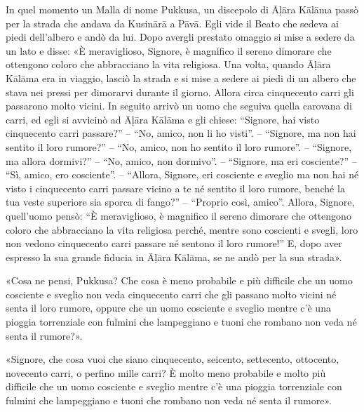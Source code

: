 

In quel momento un Malla di nome Pukkusa, un discepolo di Āḷāra Kālāma
passò per la strada che andava da Kusinārā a Pāvā. Egli vide il Beato
che sedeva ai piedi dell’albero e andò da lui. Dopo avergli prestato
omaggio si mise a sedere da un lato e disse: «È meraviglioso, Signore, è
magnifico il sereno dimorare che ottengono coloro che abbracciano la
vita religiosa. Una volta, quando Āḷāra Kālāma era in viaggio, lasciò la
strada e si mise a sedere ai piedi di un albero che stava nei pressi per
dimorarvi durante il giorno. Allora circa cinquecento carri gli
passarono molto vicini. In seguito arrivò un uomo che seguiva quella
carovana di carri, ed egli si avvicinò ad Āḷāra Kālāma e gli chiese:
“Signore, hai visto cinquecento carri passare?” – “No, amico, non li ho
visti”. – “Signore, ma non hai sentito il loro rumore?” – “No, amico,
non ho sentito il loro rumore”. – “Signore, ma allora dormivi?” – “No,
amico, non dormivo”. – “Signore, ma eri cosciente?” – “Sì, amico, ero
cosciente”. – “Allora, Signore, eri cosciente e sveglio ma non hai né
visto i cinquecento carri passare vicino a te né sentito il loro rumore,
benché la tua veste superiore sia sporca di fango?” – “Proprio così,
amico”. Allora, Signore, quell’uomo pensò: “È meraviglioso, è magnifico
il sereno dimorare che ottengono coloro che abbracciano la vita
religiosa perché, mentre sono coscienti e svegli, loro non vedono
cinquecento carri passare né sentono il loro rumore!” E, dopo aver
espresso la sua grande fiducia in Āḷāra Kālāma, se ne andò per la sua
strada».


«Cosa ne pensi, Pukkusa? Che cosa è meno probabile e più difficile che
un uomo cosciente e sveglio non veda cinquecento carri che gli passano
molto vicini né senta il loro rumore, oppure che un uomo cosciente e
sveglio mentre c’è una pioggia torrenziale con fulmini che lampeggiano e
tuoni che rombano non veda né senta il rumore?».


«Signore, che cosa vuoi che siano cinquecento, seicento, settecento,
ottocento, novecento carri, o perfino mille carri? È molto meno
probabile e molto più difficile che un uomo cosciente e sveglio mentre
c’è una pioggia torrenziale con fulmini che lampeggiano e tuoni che
rombano non veda né senta il rumore».


